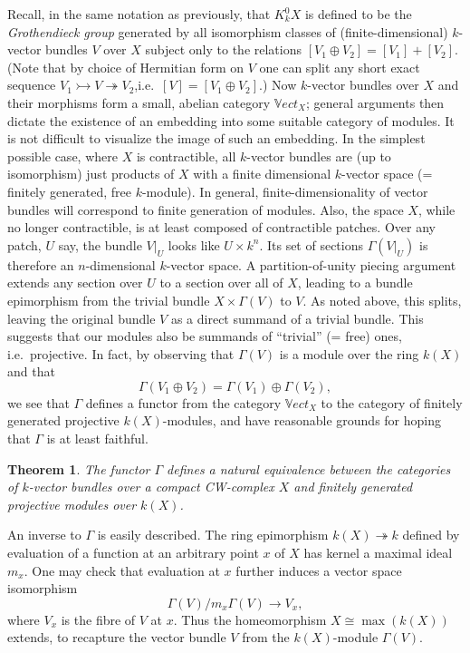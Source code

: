 \documentclass[openany,leqno]{book}  %
\newtheorem{theorem}{Theorem}[chapter]
\begin{document}
Recall, in the same notation as previously, that $K_k^0X$ is defined to be the {\em Grothendieck group} generated by all isomorphism classes of (finite-dimensional) $k$-vector bundles $V$ over $X$ subject only to the relations $[V_1\oplus V_2]=[V_1]+[V_2]$. (Note that by choice of Hermitian form on $V$ one can split any short exact sequence $V_1 \rightarrowtail V \twoheadrightarrow V_2$,i.e.\  $[V]=[V_1 \oplus V_2]$.) Now $k$-vector bundles over $X$ and their morphisms form a small, abelian category $\mathbb{V}ect_X$; general arguments then dictate the existence of an embedding into some suitable category of modules. It is not difficult to visualize the image of such an embedding. In the simplest possible case, where $X$ is contractible, all $k$-vector bundles are (up to isomorphism) just products of $X$ with a finite dimensional $k$-vector space (= finitely generated, free $k$-module). In general, finite-dimensionality of vector bundles will correspond to finite generation of modules. Also, the space $X$, while no longer contractible, is at least composed of contractible patches. Over any patch, $U$ say, the bundle $V|_U$ looks like $U\times k^n$. Its set of sections $\Gamma(V|_U)$ is therefore an $n$-dimensional $k$-vector space. A partition-of-unity piecing argument extends any section over $U$ to a section over all of $X$, leading to a bundle epimorphism from the trivial bundle $X\times \Gamma(V)$ to $V$. As noted above, this splits, leaving the original bundle $V$ as a direct summand of a trivial bundle. This suggests that our modules also be summands of ``trivial'' (= free) ones, i.e.\  projective. In fact, by observing that $\Gamma(V)$ is a module over the ring $k(X)$ and that
$$\Gamma(V_1\oplus V_2)=\Gamma(V_1)\oplus \Gamma(V_2),$$
we see that $\Gamma$ defines a functor from the category $\mathbb{V}ect_X$ to the category of finitely generated projective $k(X)$-modules, and have reasonable grounds for hoping that $\Gamma$ is at least faithful.
\begin{theorem}
The functor $\Gamma$ defines a natural equivalence between the categories of $k$-vector bundles over a compact CW-complex $X$ and finitely generated projective modules over $k(X)$.
\end{theorem}

An inverse to $\Gamma$ is easily described. The ring epimorphism $k(X)\twoheadrightarrow k$ defined by evaluation of a function at an arbitrary point $x$ of $X$ has kernel a maximal ideal $m_x$. One may check that evaluation at $x$ further induces a vector space isomorphism
$$\Gamma(V)/m_x\Gamma(V)\longrightarrow V_x,$$
where $V_x$ is the fibre of $V$ at $x$. Thus the homeomorphism $X\cong \max(k(X))$ extends, to recapture the vector bundle $V$ from the $k(X)$-module $\Gamma(V)$.
\end{document}
